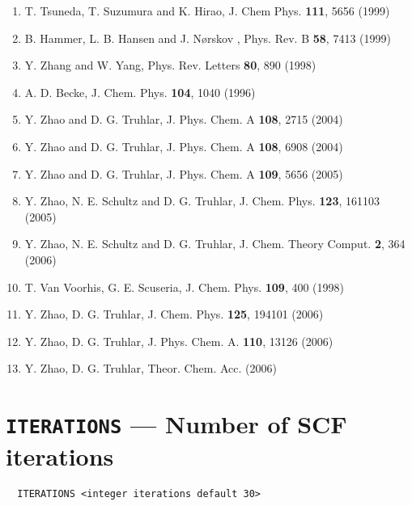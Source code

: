 {\begin{enumerate}
J. Chem Phys. {\bf 110}, 10664 (1999)\\
\item T. Tsuneda, T. Suzumura and K. Hirao,
J. Chem Phys. {\bf 111}, 5656  (1999) \\
\item B. Hammer, L. B. Hansen and J. N{\o}rskov , Phys. Rev. B {\bf 58}, 7413 (1999)\\
\item Y. Zhang and W. Yang, Phys. Rev. Letters {\bf 80}, 890 (1998)\\
\item A. D. Becke, J. Chem. Phys. {\bf 104}, 1040 (1996)\\
\item Y. Zhao and D. G. Truhlar, J. Phys. Chem. A {\bf 108}, 2715 (2004)\\
\item Y. Zhao and D. G. Truhlar, J. Phys. Chem. A {\bf 108}, 6908 (2004)\\
\item Y. Zhao and D. G. Truhlar, J. Phys. Chem. A {\bf 109}, 5656 (2005)\\
\item Y. Zhao, N. E. Schultz and D. G. Truhlar, J. Chem. Phys. {\bf 123}, 161103 (2005)\\
\item Y. Zhao, N. E. Schultz and D. G. Truhlar, J. Chem. Theory Comput. {\bf 2}, 364 (2006)\\
\item T. Van Voorhis, G. E. Scuseria, J. Chem. Phys. {\bf 109}, 400 (1998)\\
\item Y. Zhao, D. G. Truhlar, J. Chem. Phys. {\bf 125}, 194101 (2006)\\
\item Y. Zhao, D. G. Truhlar, J. Phys. Chem. A. {\bf 110}, 13126 (2006)\\
\item Y. Zhao, D. G. Truhlar, Theor. Chem. Acc. (2006)
\end{enumerate}
}
\onecolumn

\section{{\tt ITERATIONS} --- Number of SCF iterations}

\begin{verbatim}
  ITERATIONS <integer iterations default 30>
\end{verbatim}

